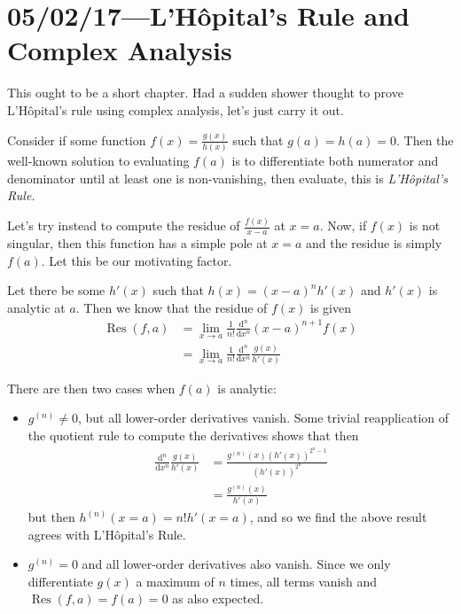 \documentclass[12pt]{report}
\DeclareMathOperator{\Res}{Res}
\begin{document}
\chapter{05/02/17---L'H\^opital's Rule and Complex Analysis}

This ought to be a short chapter. Had a sudden shower thought to prove
L'H\^opital's rule using complex analysis, let's just carry it out.

Consider if some function $f(x) = \frac{g(x)}{h(x)}$ such that $g(a) = h(a) =
0$. Then the well-known solution to evaluating $f(a)$ is to differentiate both
numerator and denominator until at least one is non-vanishing, then evaluate,
this is \emph{L'H\^opital's Rule}.

Let's try instead to compute the residue of $\frac{f(x)}{x - a}$ at $x = a$.
Now, if $f(x)$ is not singular, then this function has a simple pole at $x = a$
and the residue is simply $f(a)$. Let this be our motivating factor.

Let there be some $h'(x)$ such that $h(x) = (x-a)^nh'(x)$ and $h'(x)$ is
analytic at $a$. Then we know that the residue of $f(x)$ is given
\begin{align}
    \Res(f, a)
        &= \lim_{x \to a}\frac{1}{n!}
            \frac{\mathrm{d}^n}{\mathrm{d}x^n}
            (x - a)^{n+1} f(x)\\
        &= \lim_{x \to a}\frac{1}{n!}
            \frac{\mathrm{d}^n}{\mathrm{d}x^n}
            \frac{g(x)}{h'(x)} \nonumber
\end{align}

There are then two cases when $f(a)$ is analytic:
\begin{itemize}
    \item $g^{(n)} \neq 0$, but all lower-order derivatives vanish. Some trivial
        reapplication of the quotient rule to compute the derivatives shows that
        then
        \begin{align*}
            \frac{\mathrm{d}^n}{\mathrm{d}x^n} \frac{g(x)}{h'(x)}
                &= \frac{g^{(n)}(x)(h'(x))^{2^n - 1}}{(h'(x))^{2^n}}\\
                &= \frac{g^{(n)}(x)}{h'(x)}
        \end{align*}
        but then $h^{(n)}(x = a) = n! h'(x=a)$, and so we find the above result
        agrees with L'H\^opital's Rule.

    \item $g^{(n)} = 0$ and all lower-order derivatives also vanish. Since we
        only differentiate $g(x)$ a maximum of $n$ times, all terms vanish and
        $\Res(f, a) = f(a) = 0$ as also expected.
\end{itemize}
\end{document}
